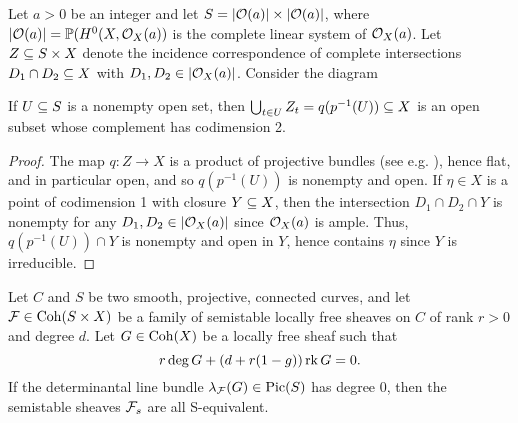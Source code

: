 Let $a > 0$ be an integer and let $S = |\mathcal{O}(a)| \times |\mathcal{O}(a)|$, where $|\mathcal{O}(a)| = \mathbb{P}(H^0(X, \mathcal{O}_X(a))$ is the complete linear system of $\mathcal{O}_X(a)$. Let $Z \subseteq S \times X$ denote the incidence correspondence of complete intersections $D_1 \cap D_2 \subseteq X$ with $D_1, D_2 \in |\mathcal{O}_X(a)|$. Consider the diagram
\begin{center}
\end{center}
\begin{lem}\label{codim2union}
    If $U \subseteq S$ is a nonempty open set, then $\bigcup_{t \in U} Z_t = q(p^{-1}(U)) \subseteq X$ is an open subset whose complement has codimension 2.
\end{lem}
\begin{proof}
    The map $q: Z \to X$ is a product of projective bundles (see e.g. \cite[Section 3.1]{HL}), hence flat, and in particular open, and so $q(p^{-1}(U))$ is nonempty and open. If $\eta \in X$ is a point of codimension 1 with closure $Y \subseteq X$, then the intersection $D_1 \cap D_2 \cap Y$ is nonempty for any $D_1, D_2 \in |\mathcal{O}_X(a)|$ since $\mathcal{O}_X(a)$ is ample. Thus, $q(p^{-1}(U)) \cap Y$ is nonempty and open in $Y$, hence contains $\eta$ since $Y$ is irreducible.
\end{proof}


\begin{lem}\label{seshadrimainlemma2}
    Let $C$ and $S$ be two smooth, projective, connected curves, and let $\mathcal{F} \in \operatorname{\mathrm{Coh}}(S \times X)$ be a family of semistable locally free sheaves on $C$ of rank $r > 0$ and degree $d$. Let $G \in \operatorname{\mathrm{Coh}}(X)$ be a locally free sheaf such that
    \[ r \deg G + (d + r(1-g)) \operatorname{\mathrm{rk}} G = 0. \]
    If the determinantal line bundle $\lambda_{\mathcal{F}}(G) \in \mathrm{Pic}(S)$ has degree 0, then the semistable sheaves $\mathcal{F}_s$ are all S-equivalent.
\end{lem}

\begin{lem}\label{leadingcoeff1dim}

\end{lem}

